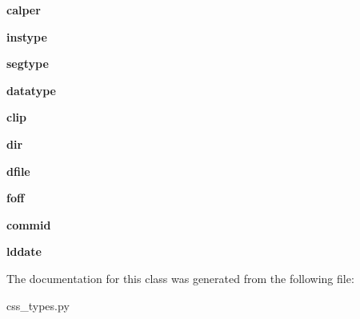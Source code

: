 \begin{DoxyCompactItemize}
\item 
\hypertarget{classcss__types_1_1wfdisc30_a78ac3e6fb41d7cf6388892bcdb632cc2}{}{\bfseries calper}\label{classcss__types_1_1wfdisc30_a78ac3e6fb41d7cf6388892bcdb632cc2}

\item 
\hypertarget{classcss__types_1_1wfdisc30_a65ee51ad19d010fc17d162ff2f844459}{}{\bfseries instype}\label{classcss__types_1_1wfdisc30_a65ee51ad19d010fc17d162ff2f844459}

\item 
\hypertarget{classcss__types_1_1wfdisc30_a1a2098686ef792f902a92c4387edc1e8}{}{\bfseries segtype}\label{classcss__types_1_1wfdisc30_a1a2098686ef792f902a92c4387edc1e8}

\item 
\hypertarget{classcss__types_1_1wfdisc30_a7efd97ecce5067dfe7df1bfe0a327a5d}{}{\bfseries datatype}\label{classcss__types_1_1wfdisc30_a7efd97ecce5067dfe7df1bfe0a327a5d}

\item 
\hypertarget{classcss__types_1_1wfdisc30_ae3cd00a1b675d5002c7659741eea8199}{}{\bfseries clip}\label{classcss__types_1_1wfdisc30_ae3cd00a1b675d5002c7659741eea8199}

\item 
\hypertarget{classcss__types_1_1wfdisc30_a31b5344a6690832261a51a6bb3916dee}{}{\bfseries dir}\label{classcss__types_1_1wfdisc30_a31b5344a6690832261a51a6bb3916dee}

\item 
\hypertarget{classcss__types_1_1wfdisc30_a2f97b871d5dfad0cf0a11486159c4974}{}{\bfseries dfile}\label{classcss__types_1_1wfdisc30_a2f97b871d5dfad0cf0a11486159c4974}

\item 
\hypertarget{classcss__types_1_1wfdisc30_a75bd709bc3d4b90449adb0e3d19bde46}{}{\bfseries foff}\label{classcss__types_1_1wfdisc30_a75bd709bc3d4b90449adb0e3d19bde46}

\item 
\hypertarget{classcss__types_1_1wfdisc30_a756128ec59ffadf44f53872c5beafa1f}{}{\bfseries commid}\label{classcss__types_1_1wfdisc30_a756128ec59ffadf44f53872c5beafa1f}

\item 
\hypertarget{classcss__types_1_1wfdisc30_ad1c07de92b48c72a557521875dda4351}{}{\bfseries lddate}\label{classcss__types_1_1wfdisc30_ad1c07de92b48c72a557521875dda4351}

\end{DoxyCompactItemize}


The documentation for this class was generated from the following file\+:\begin{DoxyCompactItemize}
\item 
css\+\_\+types.\+py\end{DoxyCompactItemize}
